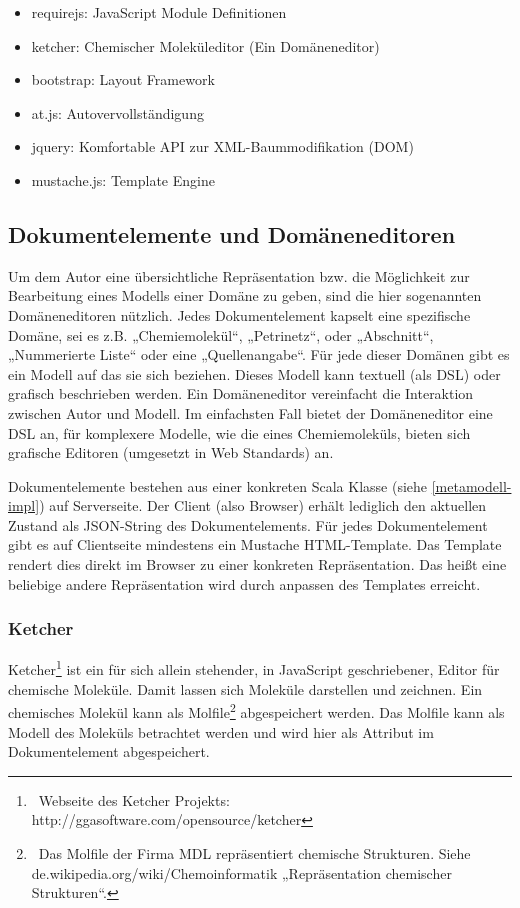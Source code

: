  
\begin{itemize}

\item requirejs: JavaScript Module Definitionen
\item ketcher: Chemischer Moleküleditor (Ein Domäneneditor)
\item bootstrap: Layout Framework
\item at.js: Autovervollständigung
\item jquery: Komfortable API zur XML-Baummodifikation (DOM)
\item mustache.js: Template Engine
\end{itemize}
 
\subsection{Dokumentelemente und Domäneneditoren}\label{}
 
Um dem Autor eine übersichtliche Repräsentation bzw. die Möglichkeit zur Bearbeitung eines Modells einer Domäne zu geben, sind die hier sogenannten Domäneneditoren nützlich. Jedes Dokumentelement kapselt eine spezifische Domäne, sei es z.B. „Chemiemolekül“, „Petrinetz“, oder „Abschnitt“, „Nummerierte Liste“ oder eine „Quellenangabe“. Für jede dieser Domänen gibt es ein Modell auf das sie sich beziehen. Dieses Modell kann textuell (als DSL) oder grafisch beschrieben werden. Ein Domäneneditor vereinfacht die Interaktion zwischen Autor und Modell. Im einfachsten Fall bietet der Domäneneditor eine DSL an, für komplexere Modelle, wie die eines Chemiemoleküls, bieten sich grafische Editoren (umgesetzt in Web Standards) an.

 
Dokumentelemente bestehen aus einer konkreten Scala Klasse (siehe \ref{metamodell-impl}) auf Serverseite. Der Client (also Browser) erhält lediglich den aktuellen Zustand als JSON-String des Dokumentelements. Für jedes Dokumentelement gibt es auf Clientseite mindestens ein Mustache HTML-Template. Das Template rendert dies direkt im Browser zu einer konkreten Repräsentation. Das heißt eine beliebige andere Repräsentation wird durch anpassen des Templates erreicht.

 
\subsubsection{Ketcher}\label{}

 
Ketcher\footnote{~Webseite des Ketcher Projekts: http://ggasoftware.com/opensource/ketcher} ist ein für sich allein stehender, in JavaScript geschriebener, Editor für chemische Moleküle. Damit lassen sich Moleküle darstellen und zeichnen. Ein chemisches Molekül kann als Molfile\footnote{~Das Molfile der Firma MDL repräsentiert chemische Strukturen. Siehe de.wikipedia.org/wiki/Chemoinformatik „Repräsentation chemischer Strukturen“.} abgespeichert werden. Das Molfile kann als Modell des Moleküls betrachtet werden und wird hier als Attribut im Dokumentelement abgespeichert.

